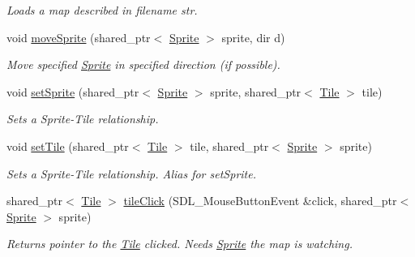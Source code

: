 \begin{DoxyCompactItemize}
\begin{DoxyCompactList}\small\item\em Loads a map described in filename str. \end{DoxyCompactList}\item 
void \hyperlink{class_terr_aa0023b4af20266bb359b94dd21d96ff5}{move\+Sprite} (shared\+\_\+ptr$<$ \hyperlink{class_sprite}{Sprite} $>$ sprite, dir d)\hypertarget{class_terr_aa0023b4af20266bb359b94dd21d96ff5}{}\label{class_terr_aa0023b4af20266bb359b94dd21d96ff5}

\begin{DoxyCompactList}\small\item\em Move specified \hyperlink{class_sprite}{Sprite} in specified direction (if possible). \end{DoxyCompactList}\item 
void \hyperlink{class_terr_aaa2f0f8ba60f462070a0f7d40d1f4ed0}{set\+Sprite} (shared\+\_\+ptr$<$ \hyperlink{class_sprite}{Sprite} $>$ sprite, shared\+\_\+ptr$<$ \hyperlink{class_tile}{Tile} $>$ tile)\hypertarget{class_terr_aaa2f0f8ba60f462070a0f7d40d1f4ed0}{}\label{class_terr_aaa2f0f8ba60f462070a0f7d40d1f4ed0}

\begin{DoxyCompactList}\small\item\em Sets a Sprite-\/\+Tile relationship. \end{DoxyCompactList}\item 
void \hyperlink{class_terr_abd9bbf7cc0d7f0ef48a2198f5b2047ba}{set\+Tile} (shared\+\_\+ptr$<$ \hyperlink{class_tile}{Tile} $>$ tile, shared\+\_\+ptr$<$ \hyperlink{class_sprite}{Sprite} $>$ sprite)\hypertarget{class_terr_abd9bbf7cc0d7f0ef48a2198f5b2047ba}{}\label{class_terr_abd9bbf7cc0d7f0ef48a2198f5b2047ba}

\begin{DoxyCompactList}\small\item\em Sets a Sprite-\/\+Tile relationship. Alias for set\+Sprite. \end{DoxyCompactList}\item 
shared\+\_\+ptr$<$ \hyperlink{class_tile}{Tile} $>$ \hyperlink{class_terr_ab1b055dc8ce5abea86d84472e27ceb48}{tile\+Click} (S\+D\+L\+\_\+\+Mouse\+Button\+Event \&click, shared\+\_\+ptr$<$ \hyperlink{class_sprite}{Sprite} $>$ sprite)\hypertarget{class_terr_ab1b055dc8ce5abea86d84472e27ceb48}{}\label{class_terr_ab1b055dc8ce5abea86d84472e27ceb48}

\begin{DoxyCompactList}\small\item\em Returns pointer to the \hyperlink{class_tile}{Tile} clicked. Needs \hyperlink{class_sprite}{Sprite} the map is watching. \end{DoxyCompactList}\end{DoxyCompactItemize}
